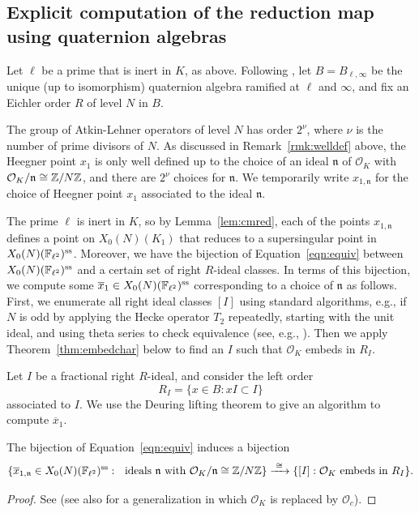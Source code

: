 \documentclass{article} \usepackage[active]{srcltx}
\newcommand{\n}{\mathfrak{n}}
\renewcommand{\O}{\mathcal{O}}
\DeclareMathOperator{\supersingular}{ss}
\renewcommand{\ss}{\supersingular}
\begin{document}
\subsection{Explicit computation of the reduction map using quaternion
  algebras}\label{sec:explicitred}

Let $\ell$ be a prime that is inert in $K$, as above.
Following  \cite{stein:modabvarnotes, pizer:alg}, let
$B=B_{\ell,\infty}$ be the unique (up to isomorphism) quaternion
algebra ramified at $\ell$ and $\infty$, and fix an Eichler order $R$ of
level $N$ in $B$.  


The group of Atkin-Lehner operators of level $N$ has order $2^{\nu}$,
where $\nu$ is the number of prime divisors of $N$.  
As discussed in Remark~\ref{rmk:welldef} above, 
the Heegner point
$x_1$ is only well defined up to the choice of an ideal $\n$ of
$\O_K$ with $\O_K/\n\isom \Z/N\Z$, and there are $2^{\nu}$ 
choices for $\n$.  We temporarily write $x_{1,\n}$ for the
choice of Heegner point $x_1$ associated to the ideal $\n$. 

The prime $\ell$ is inert in $K$, so by Lemma~\ref{lem:cmred}, each of
the points $x_{1,\n}$ defines a point on $X_0(N)(K_1)$ that reduces to
a supersingular point in $X_0(N)(\F_{\ell^2})^{\ss}$.  Moreover, we
have the bijection of Equation~\ref{eqn:equiv} between
$X_0(N)(\F_{\ell^2})^{\ss}$ and a certain set of right $R$-ideal
classes.  In terms of this bijection, we compute some
$\overline{x}_1\in X_0(N)(\F_{\ell^2})^{\ss}$ corresponding to a
choice of $\n$ as follows.  First, we enumerate all right ideal
classes $[I]$ using standard algorithms, e.g., if $N$ is odd by
applying the Hecke operator $T_2$ repeatedly, starting with the unit
ideal, and using theta series to check equivalence (see, e.g.,
\cite[Prop.~1.18]{pizer:alg}).  Then we apply
Theorem~\ref{thm:embedchar} below to find an $I$ such that
$\O_K$ embeds in $R_I$.  

Let $I$ be a fractional right $R$-ideal, and  consider the left order
$$
  R_I = \{x \in B : xI \subset I\}
$$ 
 associated to $I$.
We use the Deuring lifting theorem to give an algorithm
to compute $\overline{x}_1$.
\begin{theorem}[Deuring]\label{thm:embedchar} 
The bijection of Equation~\eqref{eqn:equiv} induces a bijection
$$
\{\overline{x}_{1,\n} \in X_0(N)(\F_{\ell^2})^{\ss}:  \,\,\,\, \text{ideals }\n\text{ with } \cO_K/\n \isom \Z/N\Z\} \xrightarrow{\,\,\isom\,\,}
    \{ [I] : \O_K \text{ embeds in }R_I \}.
$$
\end{theorem}
\begin{proof}
  See \cite[Prop.~2.7]{gross-zagier:singular} (see also
  \cite[\S2]{jetchev-kane:equi} for a generalization in which $\O_K$
  is replaced by $\O_c$).
\end{proof}
\end{document}
